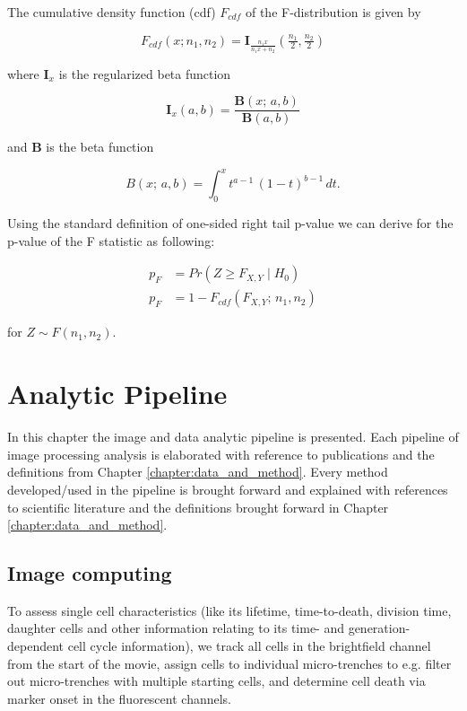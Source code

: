 \documentclass[pdftex,12pt,a4paper]{report}
\begin{document}
The cumulative density function (cdf) $F_{cdf}$ of the F-distribution is given by

\begin{equation}
F_{cdf}(x; n_1, n_2)= \mathbf{I}_{\frac{n_1 x}{n_1 x + n_2}}\left (\tfrac{n_1}{2}, \tfrac{n_2}{2} \right)
\end{equation}

where $\mathbf{I}_x$ is the regularized beta function

\begin{equation}
\mathbf{I}_x(a,b) = \frac{\mathbf{B}(x;\,a,b)}{\mathbf{B}(a,b)}
\end{equation}

and $\mathbf{B}$ is the beta function

\begin{equation}
B(x;\,a,b) = \int_0^x t^{a-1}\,(1-t)^{b-1}\,dt.
\end{equation}

Using the  standard definition of one-sided right tail p-value we can derive for the p-value of the F statistic as following:

\begin{align}
  p_F &= Pr(Z \geq F_{X,Y} \mid H_0) \nonumber \\
  p_F &= 1 - F_{cdf}(F_{X,Y}; \, n_1, n_2)\label{eq:ftest_pval}
\end{align}

for $Z \sim F(n_1, n_2)$.

\chapter{Analytic Pipeline}
\label{chapter:analytic_pipeline}

In this chapter the image and data analytic pipeline is presented. Each pipeline of image processing analysis is elaborated with reference to publications and the definitions from Chapter \ref{chapter:data_and_method}.
Every method developed/used in the pipeline is brought forward and explained with references to scientific literature and the definitions brought forward in Chapter \ref{chapter:data_and_method}.

\section{Image computing}

To assess single cell characteristics (like its lifetime, time-to-death, division time, daughter cells and other information relating to its time- and generation-dependent cell cycle information), we track all cells in the brightfield channel from the start of the movie, assign cells to individual micro-trenches to e.g. filter out micro-trenches with multiple starting cells, and determine cell death via marker onset in the fluorescent channels.
\end{document}
